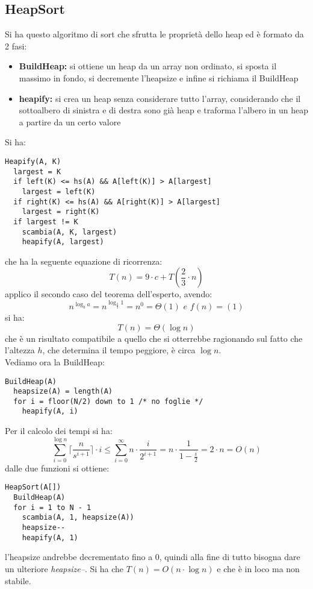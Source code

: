 \documentclass[a4paper,12pt,oneside,tikz]{book}
\begin{document}
\subsection{HeapSort}
Si ha questo algoritmo di sort che sfrutta le proprietà dello heap
ed è formato da 2 fasi:
\begin{itemize}
\item \textbf{BuildHeap:} si ottiene un heap da un array non ordinato, si sposta il massimo in fondo, si decremente l'heapsize e infine si richiama il BuildHeap
\item \textbf{heapify:} si crea un heap senza considerare tutto l'array, considerando che il sottoalbero di sinistra e di destra sono già heap e traforma l'albero in un heap a partire da un certo valore
\end{itemize}
Si ha:
\begin{verbatim}
Heapify(A, K)
  largest = K
  if left(K) <= hs(A) && A[left(K)] > A[largest]
    largest = left(K)
  if right(K) <= hs(A) && A[right(K)] > A[largest]
    largest = right(K)
  if largest != K
    scambia(A, K, largest)
    heapify(A, largest)
\end{verbatim}
che ha la seguente equazione di ricorrenza:
$$T(n)=9\cdot c+T\left(\frac{2}{3}\cdot n\right)$$
applico il secondo caso del teorema dell'esperto, avendo:
$$n^{\log_b a}=n^{\log_{\frac{2}{3}} 1}=n^0=\Theta(1)\,\,e\,\, f(n)=(1)$$
si ha:
$$T(n)=\Theta(\log n)$$
che è un risultato compatibile a quello che si otterrebbe ragionando sul fatto che l'altezza $h$, che determina il tempo peggiore, è circa $\log n$.\\
Vediamo ora la BuildHeap:
\begin{verbatim}
BuildHeap(A)
  heapsize(A) = length(A)
  for i = floor(N/2) down to 1 /* no foglie */
    heapify(A, i)
\end{verbatim}
Per il calcolo dei tempi si ha:
$$\sum_{i=0}^{\log n}\big\lceil{\frac{n}{s^{i+1}}}\big\rceil\cdot i\leq \sum_{i=0}^{\infty}n\cdot \frac{i}{2^{i+1}}=n\cdot \frac{1}{1-\frac{i}{2}}=2\cdot n=O(n)$$
dalle due funzioni si ottiene:
\begin{verbatim}
HeapSort(A[])
  BuildHeap(A)
  for i = 1 to N - 1
    scambia(A, 1, heapsize(A))
    heapsize--
    heapify(A, 1)
\end{verbatim}
l'heapsize andrebbe decrementato fino a 0, quindi alla fine di tutto bisogna dare un ulteriore \textit{heapsize--}. Si ha che $T(n)=O(n\cdot \log n)$ e che è in loco ma non stabile.
\end{document}
